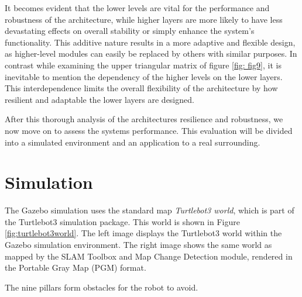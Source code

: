 \documentclass[%
paper=A4,               %
twoside=true,           %
openright,              %
11pt,                   %
bibliography=totoc,     %
titlepage=on,           %
DIV=12,                 %
BCOR=1.5cm,             %
parskip=half,            %
final
]{scrreprt}
\begin{document}
	It becomes evident that the lower levels are vital for the performance and robustness of the architecture, while higher layers are more likely to have less devastating effects on overall stability or simply enhance the system's functionality. This additive nature results in a more adaptive and flexible design, as higher-level modules can easily be replaced by others with similar purposes. In contrast while examining the upper triangular matrix of figure \ref{fig: fig9}, it is inevitable to mention the dependency of the higher levels on the lower layers. This interdependence limits the overall flexibility of the architecture by how resilient and adaptable the lower layers are designed. 
	
	After this thorough analysis of the architectures resilience and robustness, we now move on to assess the systems performance. This evaluation will be divided into a simulated environment and an application to a real surrounding. 
	
	\section{Simulation} 
	The Gazebo simulation uses the standard map \textit{Turtlebot3 world}, which is part of the Turtlebot3 simulation package. This world is shown in Figure \ref{fig:turtlebot3world}. The left image displays the Turtlebot3 world within the Gazebo simulation environment. The right image shows the same world as mapped by the SLAM Toolbox and Map Change Detection module, rendered in the Portable Gray Map (PGM) format. 
	
	The nine pillars form obstacles for the robot to avoid.
	
\end{document}
